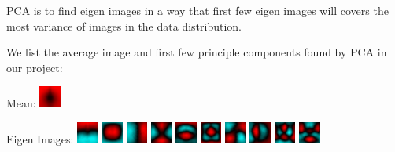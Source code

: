 \documentclass{acm_proc_article-sp}
\begin{document}
PCA is to find eigen images in a way that first few eigen images will covers
the most variance of images in the data distribution.

We list the average image and first few principle components found by PCA in
our project:

Mean: \includegraphics[width=20pt]{../data/PCA_visualize/eigvec0.png}

Eigen Images: \includegraphics[width=20pt]{../data/PCA_visualize/eigvec1.png}
        \includegraphics[width=20pt]{../data/PCA_visualize/eigvec2.png}
        \includegraphics[width=20pt]{../data/PCA_visualize/eigvec3.png}
        \includegraphics[width=20pt]{../data/PCA_visualize/eigvec4.png}
        \includegraphics[width=20pt]{../data/PCA_visualize/eigvec5.png}
        \includegraphics[width=20pt]{../data/PCA_visualize/eigvec6.png}
        \includegraphics[width=20pt]{../data/PCA_visualize/eigvec7.png}
        \includegraphics[width=20pt]{../data/PCA_visualize/eigvec8.png}
        \includegraphics[width=20pt]{../data/PCA_visualize/eigvec9.png}
        \includegraphics[width=20pt]{../data/PCA_visualize/eigvec10.png}
\end{document}
